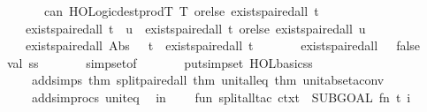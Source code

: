 \begin{isabellebody}
\ \ \ \ \ \ \ \ \ \ can\ HOLogic{\isachardot}{\kern0pt}dest{\isacharunderscore}{\kern0pt}prodT\ T\ orelse\ exists{\isacharunderscore}{\kern0pt}paired{\isacharunderscore}{\kern0pt}all\ t\isanewline
\ \ \ \ \ \ {\isacharbar}{\kern0pt}\ exists{\isacharunderscore}{\kern0pt}paired{\isacharunderscore}{\kern0pt}all\ {\isacharparenleft}{\kern0pt}t\ {\isachardollar}{\kern0pt}\ u{\isacharparenright}{\kern0pt}\ {\isacharequal}{\kern0pt}\ exists{\isacharunderscore}{\kern0pt}paired{\isacharunderscore}{\kern0pt}all\ t\ orelse\ exists{\isacharunderscore}{\kern0pt}paired{\isacharunderscore}{\kern0pt}all\ u\isanewline
\ \ \ \ \ \ {\isacharbar}{\kern0pt}\ exists{\isacharunderscore}{\kern0pt}paired{\isacharunderscore}{\kern0pt}all\ {\isacharparenleft}{\kern0pt}Abs\ {\isacharparenleft}{\kern0pt}{\isacharunderscore}{\kern0pt}{\isacharcomma}{\kern0pt}\ {\isacharunderscore}{\kern0pt}{\isacharcomma}{\kern0pt}\ t{\isacharparenright}{\kern0pt}{\isacharparenright}{\kern0pt}\ {\isacharequal}{\kern0pt}\ exists{\isacharunderscore}{\kern0pt}paired{\isacharunderscore}{\kern0pt}all\ t\isanewline
\ \ \ \ \ \ {\isacharbar}{\kern0pt}\ exists{\isacharunderscore}{\kern0pt}paired{\isacharunderscore}{\kern0pt}all\ {\isacharunderscore}{\kern0pt}\ {\isacharequal}{\kern0pt}\ false{\isacharsemicolon}{\kern0pt}\isanewline
\ \ \ \ val\ ss\ {\isacharequal}{\kern0pt}\isanewline
\ \ \ \ \ \ simpset{\isacharunderscore}{\kern0pt}of\isanewline
\ \ \ \ \ \ \ {\isacharparenleft}{\kern0pt}put{\isacharunderscore}{\kern0pt}simpset\ HOL{\isacharunderscore}{\kern0pt}basic{\isacharunderscore}{\kern0pt}ss\ \isactrlcontext \isanewline
\ \ \ \ \ \ \ \ addsimps\ {\isacharbrackleft}{\kern0pt}{\isacharat}{\kern0pt}{\isacharbraceleft}{\kern0pt}thm\ split{\isacharunderscore}{\kern0pt}paired{\isacharunderscore}{\kern0pt}all{\isacharbraceright}{\kern0pt}{\isacharcomma}{\kern0pt}\ {\isacharat}{\kern0pt}{\isacharbraceleft}{\kern0pt}thm\ unit{\isacharunderscore}{\kern0pt}all{\isacharunderscore}{\kern0pt}eq{}{\isacharbraceright}{\kern0pt}{\isacharcomma}{\kern0pt}\ {\isacharat}{\kern0pt}{\isacharbraceleft}{\kern0pt}thm\ unit{\isacharunderscore}{\kern0pt}abs{\isacharunderscore}{\kern0pt}eta{\isacharunderscore}{\kern0pt}conv{\isacharbraceright}{\kern0pt}{\isacharbrackright}{\kern0pt}\isanewline
\ \ \ \ \ \ \ \ addsimprocs\ {\isacharbrackleft}{\kern0pt}\isactrlsimproc {\isasymopen}unit{\isacharunderscore}{\kern0pt}eq{\isasymclose}{\isacharbrackright}{\kern0pt}{\isacharparenright}{\kern0pt}{\isacharsemicolon}{\kern0pt}\isanewline
\ \ in\isanewline
\ \ \ \ fun\ split{\isacharunderscore}{\kern0pt}all{\isacharunderscore}{\kern0pt}tac\ ctxt\ {\isacharequal}{\kern0pt}\ SUBGOAL\ {\isacharparenleft}{\kern0pt}fn\ {\isacharparenleft}{\kern0pt}t{\isacharcomma}{\kern0pt}\ i{\isacharparenright}{\kern0pt}\ {\isacharequal}{\kern0pt}{\isachargreater}{\kern0pt}\isanewline

\end{isabellebody}
